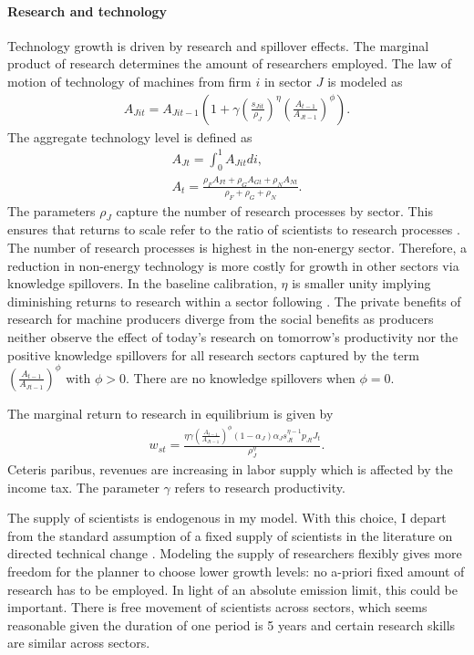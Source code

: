 \paragraph{Research and technology}
Technology growth is driven by research and spillover effects. The marginal product of research determines the amount of researchers employed.
The law of motion of technology of machines from firm $i$ in sector $J$ is modeled as
\begin{align*}
A_{Jit}=A_{Jit-1}\left(1+\gamma\left(\frac{s_{Jit}}{\rho_J}\right)^\eta\left(\frac{A_{t-1}}{A_{Jt-1}}\right)^\phi\right).
\end{align*}
The aggregate technology level is defined as
\begin{align*}
A_{Jt}=\int_{0}^{1}A_{Jit}di,\\
A_{t}=\frac{\rho_FA_{Ft}+\rho_GA_{Gt}+\rho_N A_{Nt}}{\rho_F+\rho_G+\rho_N}.
\end{align*}
The parameters $\rho_J$ capture the number of research processes by sector. This ensures that returns to scale refer to the ratio of scientists to research processes \citep{Fried2018ClimateAnalysis}. 
The number of research processes is highest in the non-energy sector. Therefore, a reduction in non-energy technology is more costly for growth in other sectors via knowledge spillovers. 
In the baseline calibration, $\eta$ is smaller unity implying diminishing returns to research within a sector following \cite{Fried2018ClimateAnalysis}. 
The private benefits of research for machine producers diverge from the social benefits as  producers neither observe the effect of today's research on tomorrow's productivity nor the positive knowledge spillovers for all research sectors captured by the term $\left(\frac{A_{t-1}}{A_{Jt-1}}\right)^\phi$ with $\phi>0$. There are no knowledge spillovers when $\phi=0$.

The marginal return to research in equilibrium is  given by
\begin{align}
w_{st}= \frac{\eta \gamma \left(\frac{A_{t-1}}{A_{Jt-1}}\right)^\phi (1-\alpha_J)\alpha_Js_{Jt}^{\eta-1}p_{Jt}J_t}{\rho_J^\eta}.
\end{align}
Ceteris paribus, revenues are increasing in labor supply which is affected by the income tax. The parameter $\gamma$ refers to research productivity.

The supply of scientists is endogenous in my model. With this choice, I depart from the standard assumption of a fixed supply of scientists in the literature on directed technical change \citep{Acemoglu2012TheChange, Fried2018ClimateAnalysis}.  Modeling the supply of researchers flexibly gives more freedom for the planner to choose lower growth levels: no a-priori fixed amount of research has to be employed. In light of an absolute emission limit, this could be important.
There is free movement of scientists across sectors, which seems reasonable given the duration of one period is 5 years and certain research skills are similar across sectors. %


